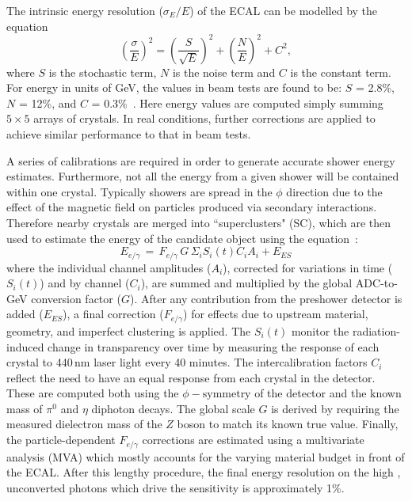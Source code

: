 The intrinsic energy resolution ($\sigma_E/E$) of the ECAL can be modelled by the equation
\begin{equation}
  \left(\frac{\sigma}{E} \right)^{2} =  
  \left(\frac{S}{\sqrt{E}} \right)^{2} +  
  \left(\frac{N}{E} \right)^{2} +  
  C^{2},
\label{eq:detector_resolution}
\end{equation}
where $S$ is the stochastic term, $N$ is the noise term and $C$ is the constant term.
For energy in units of GeV, the values in beam tests are found to be: %
$S$ = 2.8\%, $N$ = 12\%, and $C$ = 0.3\%~\cite{CMSdetector}.
Here energy values are computed simply summing $5\times5$ arrays of crystals.
In real conditions, further corrections are applied to achieve similar performance to that in beam tests.

A series of calibrations are required in order to generate accurate shower energy estimates.
Furthermore, not all the energy from a given shower will be contained within one crystal.
Typically showers are spread in the $\phi$ direction due to the effect of the magnetic field on particles produced via secondary interactions.
Therefore nearby crystals are merged into ``superclusters" (SC), 
which are then used to estimate the energy of the candidate object using the equation~\cite{ECALperformance}:
\begin{equation}
E_{e/\gamma}\, =\, F_{e/\gamma}\, G\, \Sigma_i S_i (t) C_i A_i + E_{ES}
\label{eq:}
\end{equation}
where the individual channel amplitudes ($A_i$), corrected for variations in time ($S_i (t)$) and by channel ($C_i$), 
are summed and multiplied by the global ADC-to-GeV conversion factor ($G$).
After any contribution from the preshower detector is added ($E_{ES}$), 
a final correction ($F_{e/\gamma}$) for effects due to upstream material, geometry, and imperfect clustering is applied. 
The $S_i (t)$ monitor the radiation-induced change in transparency over time by measuring the response of each crystal to 440\,nm laser light every 40 minutes. %
The intercalibration factors $C_i$ reflect the need to have an equal response from each crystal in the detector.
These are computed both using the $\phi-\textrm{symmetry}$ of the detector and the known mass of $\pi^{0}$ and $\eta$ diphoton decays.
The global scale $G$ is derived by requiring the measured dielectron mass of the $Z$ boson to match its known true value.
Finally, the particle-dependent $F_{e/\gamma}$ corrections are estimated using a multivariate analysis (MVA) which mostly accounts for the varying material budget in front of the ECAL.
After this lengthy procedure, the final energy resolution on the high \pt, unconverted photons which drive the \Hgg sensitivity is approximately 1\%.

